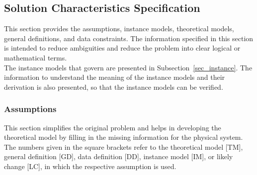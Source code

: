 \documentclass[12pt]{article}
\begin{document}
\subsection{Solution Characteristics Specification}

This section provides the assumptions, instance models, theoretical models, general definitions, and data constraints. The information specified in this section is intended to reduce ambiguities and reduce the problem into clear logical or mathematical terms. \\

The instance models that govern \progname{} are presented in
Subsection~\ref{sec_instance}. The information to understand the meaning of the
instance models and their derivation is also presented, so that the instance
models can be verified.

\subsubsection{Assumptions} \label{sec_assumpt}

This section simplifies the original problem and helps in developing the
theoretical model by filling in the missing information for the physical
system. The numbers given in the square brackets refer to the theoretical model
[TM], general definition [GD], data definition [DD], instance model [IM], or
likely change [LC], in which the respective assumption is used.
\end{document}
